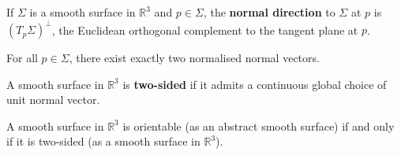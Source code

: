 \documentclass[a4paper]{article}
\begin{document}
\begin{definition}
	If \( \Sigma \) is a smooth surface in \( \mathbb R^3 \) and \( p \in \Sigma \), the \textbf{normal direction} to \( \Sigma \) at \( p \) is \( (T_p \Sigma)^\perp \), the Euclidean orthogonal complement to the tangent plane at \( p \).
\end{definition}
\begin{remark}
	For all \( p \in \Sigma \), there exist exactly two normalised normal vectors.
\end{remark}
\begin{definition}
	A smooth surface in \( \mathbb R^3 \) is \textbf{two-sided} if it admits a continuous global choice of unit normal vector.
\end{definition}
\begin{lemma}
	A smooth surface in \( \mathbb R^3 \) is orientable (as an abstract smooth surface) if and only if it is two-sided (as a smooth surface in \( \mathbb R^3 \)).
\end{lemma}
\end{document}
